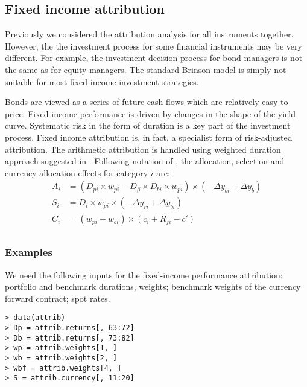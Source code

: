 \documentclass[11pt,a4paper]{article}
\begin{document}
\subsection{Fixed income attribution}
Previously we considered the attribution analysis for all instruments together. However, the the investment process for some financial instruments may be very different. For example, the investment decision process for bond managers is not the same as for equity managers. The standard Brinson model is simply not suitable for most fixed income investment strategies.

Bonds are viewed as a series of future cash flows which are relatively easy to price. Fixed income performance is driven by changes in the shape of the yield curve. Systematic risk in the form of duration is a key part of the investment process. Fixed income attribution is, in fact, a specialist form of risk-adjusted attribution. The arithmetic attribution is handled using weighted duration approach suggested in \cite{van2000fixed}. Following notation of \cite{bacon2008practical}, the allocation, selection and currency allocation effects for category $i$ are:
\[
\begin{aligned}
  A_{i} & = (D_{pi}\times w_{pi}-D_{\beta}\times D_{bi}\times w_{pi})\times (-\Delta y_{bi} + \Delta y_{b}) \\
  S_{i} & = D_{i}\times w_{pi}\times (-\Delta y_{ri} + \Delta y_{bi}) \\
  C_{i} & = (w_{pi} - w_{bi})\times (c_{i} + R_{fi} - c') \\
\end{aligned}
\]

\subsubsection{Examples}
We need the following inputs for the fixed-income performance attribution: portfolio and benchmark durations, weights; benchmark weights of the currency forward contract; spot rates.
\begingroup
\fontsize{9pt}{12pt}\selectfont
\begin{verbatim}
> data(attrib)
> Dp = attrib.returns[, 63:72]
> Db = attrib.returns[, 73:82]
> wp = attrib.weights[1, ]
> wb = attrib.weights[2, ]
> wbf = attrib.weights[4, ]
> S = attrib.currency[, 11:20]
\end{verbatim}
\endgroup
\end{document}
